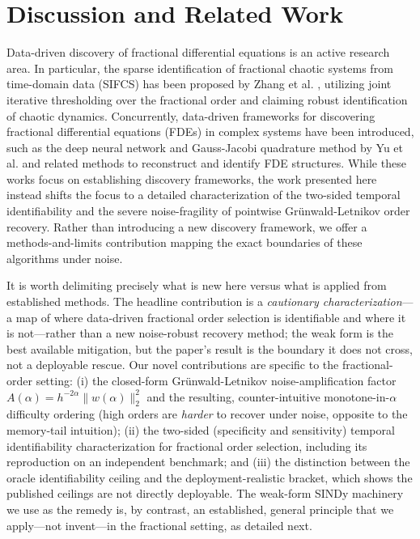 \documentclass[review,3p,times]{elsarticle}
\begin{document}
\section{Discussion and Related Work}
Data-driven discovery of fractional differential equations is an active research area. In particular, the sparse identification of fractional chaotic systems from time-domain data (SIFCS) has been proposed by Zhang et al. \cite{zhang2024sifcs}, utilizing joint iterative thresholding over the fractional order and claiming robust identification of chaotic dynamics. Concurrently, data-driven frameworks for discovering fractional differential equations (FDEs) in complex systems have been introduced, such as the deep neural network and Gauss-Jacobi quadrature method by Yu et al. \cite{yu2025fde} and related methods \cite{wang2024fracid} to reconstruct and identify FDE structures. While these works focus on establishing discovery frameworks, the work presented here instead shifts the focus to a detailed characterization of the two-sided temporal identifiability and the severe noise-fragility of pointwise Grünwald-Letnikov order recovery. Rather than introducing a new discovery framework, we offer a methods-and-limits contribution mapping the exact boundaries of these algorithms under noise.

It is worth delimiting precisely what is new here versus what is applied from established methods. The headline contribution is a \emph{cautionary characterization}---a map of where data-driven fractional order selection is identifiable and where it is not---rather than a new noise-robust recovery method; the weak form is the best available mitigation, but the paper's result is the boundary it does not cross, not a deployable rescue. Our novel contributions are specific to the fractional-order setting: (i) the closed-form Gr\"unwald-Letnikov noise-amplification factor $A(\alpha) = h^{-2\alpha}\|w(\alpha)\|_2^2$ and the resulting, counter-intuitive monotone-in-$\alpha$ difficulty ordering (high orders are \emph{harder} to recover under noise, opposite to the memory-tail intuition); (ii) the two-sided (specificity and sensitivity) temporal identifiability characterization for fractional order selection, including its reproduction on an independent benchmark; and (iii) the distinction between the oracle identifiability ceiling and the deployment-realistic bracket, which shows the published ceilings are not directly deployable. The weak-form SINDy machinery we use as the remedy is, by contrast, an established, general principle that we apply---not invent---in the fractional setting, as detailed next.
\end{document}
